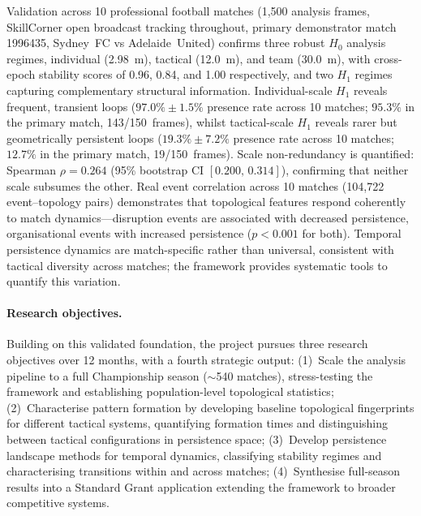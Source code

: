 Validation across 10 professional football matches (1{,}500 analysis frames, SkillCorner open broadcast tracking throughout, primary demonstrator match 1996435, Sydney~FC vs Adelaide~United) confirms three robust $H_0$ analysis regimes, individual (2.98~m), tactical (12.0~m), and team (30.0~m), with cross-epoch stability scores of 0.96, 0.84, and 1.00 respectively, and two $H_1$ regimes capturing complementary structural information. Individual-scale $H_1$ reveals frequent, transient loops ($97.0\%\pm1.5\%$ presence rate across 10 matches; $95.3\%$ in the primary match, 143/150~frames), whilst tactical-scale $H_1$ reveals rarer but geometrically persistent loops ($19.3\%\pm7.2\%$ presence rate across 10 matches; $12.7\%$ in the primary match, 19/150~frames). Scale non-redundancy is quantified: Spearman $\rho=0.264$ (95\% bootstrap CI $[0.200,\,0.314]$), confirming that neither scale subsumes the other. Real event correlation across 10 matches (104{,}722 event--topology pairs) demonstrates that topological features respond coherently to match dynamics---disruption events are associated with decreased persistence, organisational events with increased persistence ($p<0.001$ for both). Temporal persistence dynamics are match-specific rather than universal, consistent with tactical diversity across matches; the framework provides systematic tools to quantify this variation.

\paragraph{Research objectives.}
Building on this validated foundation, the project pursues three research objectives over 12 months, with a fourth strategic output: (1)~Scale the analysis pipeline to a full Championship season ($\sim$540 matches), stress-testing the framework and establishing population-level topological statistics; (2)~Characterise pattern formation by developing baseline topological fingerprints for different tactical systems, quantifying formation times and distinguishing between tactical configurations in persistence space; (3)~Develop persistence landscape methods \citep{Bubenik2015} for temporal dynamics, classifying stability regimes and characterising transitions within and across matches; (4)~Synthesise full-season results into a Standard Grant application extending the framework to broader competitive systems.

